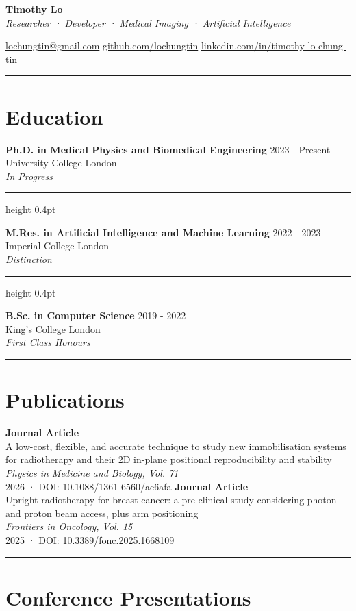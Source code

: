\documentclass[11pt,a4paper]{article}
\newcommand{\sectionline}{
    \vspace{6pt}
    \hrule
    \vspace{10pt}
}
\newcommand{\subline}{
    \vspace{4pt}
    \hrule height 0.4pt
    \vspace{6pt}
}
\begin{document}
{\Huge \textbf{Timothy Lo}} \\
\textit{Researcher · Developer · Medical Imaging · Artificial Intelligence}

\href{mailto:lochungtin@gmail.com}{lochungtin@gmail.com} \quad
\href{https://github.com/lochungtin}{github.com/lochungtin} \quad
\href{https://linkedin.com/in/timothy-lo-chung-tin}{linkedin.com/in/timothy-lo-chung-tin}

\sectionline
\section*{Education}

\textbf{Ph.D. in Medical Physics and Biomedical Engineering} \hfill 2023 - Present \\
University College London
\\
\textit{In Progress}

\subline

\textbf{M.Res. in Artificial Intelligence and Machine Learning} \hfill 2022 - 2023 \\
Imperial College London
\\
\textit{Distinction}

\subline

\textbf{B.Sc. in Computer Science} \hfill 2019 - 2022 \\
King's College London
\\
\textit{First Class Honours}

\sectionline
\section*{Publications}

\textbf{Journal Article} \\
A low-cost, flexible, and accurate technique to study new immobilisation systems for radiotherapy and their 2D in-plane positional reproducibility and stability \\
\textit{Physics in Medicine and Biology, Vol. 71} \\
2026 · DOI: 10.1088/1361-6560/ae6afa
\textbf{Journal Article} \\
Upright radiotherapy for breast cancer: a pre-clinical study considering photon and proton beam access, plus arm positioning \\
\textit{Frontiers in Oncology, Vol. 15} \\
2025 · DOI: 10.3389/fonc.2025.1668109

\sectionline
\section*{Conference Presentations}
\end{document}
